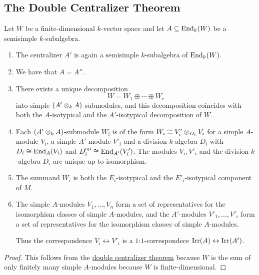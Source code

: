 \subsection*{The Double Centralizer Theorem}


\begin{corollary}
  \label{corollary: special double centralizer theorem}
  Let $W$ be a finite-dimensional $k$-vector space and let $A \subseteq \operatorname{End}_k(W)$ be a semisimple $k$-subalgebra.
  \begin{enumerate}
    \item
      The centralizer $A'$ is again a semisimple $k$-subalgebra of $\operatorname{End}_k(W)$.
    \item
      We have that $A = A''$.
    \item
      There exists a unique decomposition
      \[
        W = W_1 \oplus \dotsb \oplus W_r
      \]
      into simple $(A' \mathbin{\otimes}_k A)$-submodules, and this decomposition coincides with both the $A$-isotypical and the $A'$-isotypical decomposition of $W$.
    \item
      Each $(A' \mathbin{\otimes}_k A)$-submodule $W_i$ is of the form $W_i \cong V'_i \mathbin{\otimes}_{D_i} V_i$ for a simple $A$-module $V_i$, a simple $A'$-module $V'_i$ and a division $k$-algebra $D_i$ with $D_i \cong \operatorname{End}_A(V_i)$ and $D_i^{\operatorname{op}} \cong \operatorname{End}_{A'}(V'_i)$.
      The modules $V_i, V'_i$ and the division $k$-algebra $D_i$ are unique up to isomorphism.
    \item
      The summand $W_i$ is both the $E_i$-isotypical and the $E'_i$-isotypical component of $M$.
    \item
      The simple $A$-modules $V_1, \dotsc, V_n$ form a set of representatives for the isomorphism classes of simple $A$-modules, and the $A'$-modules $V'_1, \dotsc, V'_i$ form a set of representatives for the isomorphism classes of simple $A$-modules.
      
      Thus the correspondence $V_i \leftrightarrow V'_i$ is a $1$:$1$-correspondece $\operatorname{Irr}(A) \leftrightarrow \operatorname{Irr}(A')$.
  \end{enumerate}
\end{corollary}


\begin{proof}
  This follows from the \hyperref[theorem: general double centralizer theorem]{double centralizer theorem} because $W$ is the sum of only finitely many simple $A$-modules because $W$ is finite-dimensional.
\end{proof}



